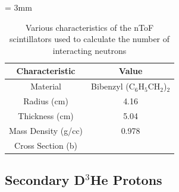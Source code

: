     \begin{table}[h!]
        \centering
        \tabulinesep = 3mm
        \begin{tabu}{c|c}
            Characteristic  &   Value \\\hline
            Material & Bibenzyl (C$_6$H$_5$CH$_2$)$_2$ \\
            Radius (cm) &  4.16 \\
            Thickness (cm) & 5.04 \\
            Mass Density (g/cc) & 0.978 \\
            Cross Section (b) & 
        \end{tabu}
        \caption[nToF Scintillator Characteristics]{Various characteristics of the nToF scintillators used to calculate the number of interacting neutrons}
        \label{tab:scintCharacteristics}
    \end{table}
    
\subsection{Secondary D$^3$He Protons}

    
